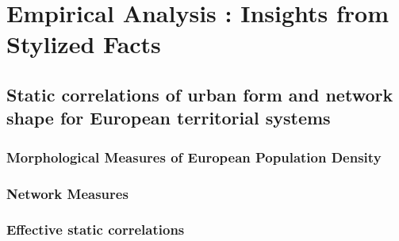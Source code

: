 


\chapter{Empirical Analysis : Insights from Stylized Facts} %

\label{ch:methodology} %















\section{Static correlations of urban form and network shape for European territorial systems}


\subsection{Morphological Measures of European Population Density}




\subsection{Network Measures}



\subsection{Effective static correlations}








